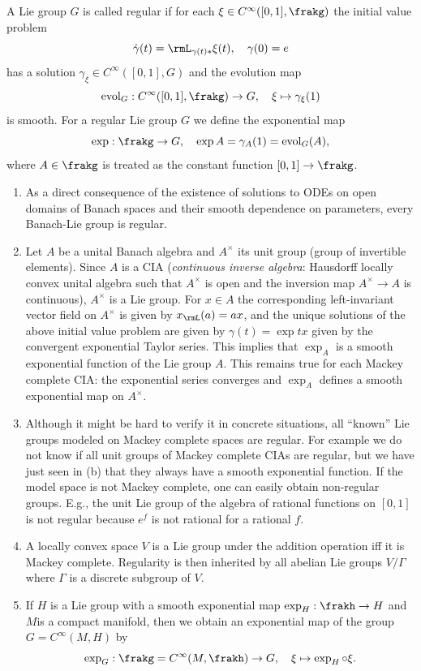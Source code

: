 \begin{defn}
    A Lie group $G$ is called regular if for each $\xi\in C^\infty([0,1],\frakg)$ the initial value problem
    \[\dot\gamma(t)=\rmL_{\gamma(t)\ast}\xi(t),\quad \gamma(0)=e\]
    has a solution $\gamma_\xi\in C^\infty([0,1],G)$ and the evolution map 
    \[\mathrm{evol}_G:C^\infty([0,1],\frakg)\to G,\quad \xi\mapsto \gamma_\xi(1)\]
    is smooth. For a regular Lie group $G$ we define the exponential map
    \[\exp:\frakg\to G,\quad \exp A=\gamma_A(1)=\mathrm{evol}_G(A),\]
    where $A\in\frakg$ is treated as the constant function $[0,1]\to \frakg$.
\end{defn}
\begin{rem}
    \begin{enumerate}[label=(\alph*)]
        \item As a direct consequence of the existence of solutions to ODEs on open domains of Banach spaces and their smooth dependence on parameters, every Banach-Lie group is regular.
        \item Let $A$ be a unital Banach algebra and $A^\times$ its unit group (group of invertible elements). Since $A$ is a CIA (\emph{continuous inverse algebra}: Hausdorff locally convex unital algebra such that $A^\times$ is open and the inversion map $A^\times\to A$ is continuous), $A^\times$ is a Lie group. For $x\in A$ the corresponding left-invariant vector field on $A^\times$ is given by $x_\rmL(a)=ax$, and the unique solutions of the above initial value problem are given by $\gamma(t)=\exp tx$ given by the convergent exponential Taylor series. This implies that $\exp_A$ is a smooth exponential function of the Lie group $A$. This remains true for each Mackey complete CIA: the exponential series converges and $\exp_A$ defines a smooth exponential map on $A^\times$.
        \item Although it might be hard to verify it in concrete situations, all ``known'' Lie groups modeled on Mackey complete spaces are regular. For example we do not know if all unit groups of Mackey complete CIAs are regular, but we have just seen in (b) that they always have a smooth exponential function. If the model space is not Mackey complete, one can easily obtain non-regular groups. E.g., the unit Lie group of the algebra of rational functions on $[0,1]$ is not regular because $e^f$ is not rational for a rational $f$.
        \item A locally convex space $V$ is a Lie group under the addition operation iff it is Mackey complete. Regularity is then inherited by all abelian Lie groups $V\slash \varGamma$ where $\varGamma$ is a discrete subgroup of $V$.
        \item If $H$ is a Lie group with a smooth exponential map $\exp_H:\frakh\to H$ and $M$is a compact manifold, then we obtain an exponential map of the group $G=C^\infty(M,H)$ by
        \[\exp_G:\frakg=C^\infty(M,\frakh)\to G,\quad \xi\mapsto \exp_H\circ \xi.\]
    \end{enumerate}
\end{rem}

